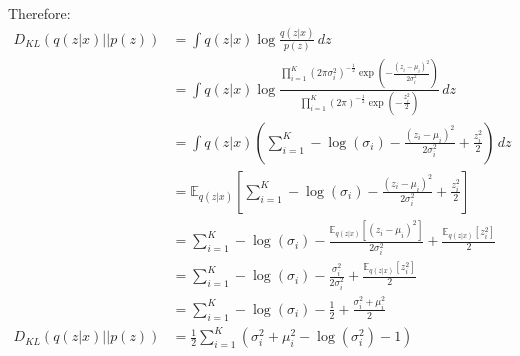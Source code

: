 \documentclass{article}
\begin{document}
Therefore:
\begin{equation}
  \begin{split}
    D_{KL} \left(q(z|x) \lvert\rvert p(z)\right) & = \int q(z|x) \log \frac{q(z|x)}{p(z)} \,dz                                                                                                                                                                                         \\
                                                 & = \int q(z|x) \log \frac{\prod_{i=1}^{K} \left(2\pi\sigma_i^2\right)^{-\frac{1}{2}} \exp\left(-\frac{(z_i - \mu_i)^2}{2\sigma_i^2}\right)}{\prod_{i=1}^{K} \left(2\pi\right)^{-\frac{1}{2}} \exp\left(-\frac{z_i^2}{2}\right)} \,dz \\
                                                 & = \int q(z|x)  \left(\sum_{i=1}^{K} -\log (\sigma_i) - \frac{(z_i - \mu_i)^2}{2\sigma_i^2} + \frac{z_i^2}{2}\right) \,dz                                                                                                            \\
                                                 & = \mathbb{E}_{q(z|x)}\left[\sum_{i=1}^{K} -\log (\sigma_i) - \frac{(z_i - \mu_i)^2}{2\sigma_i^2} + \frac{z_i^2}{2}\right]                                                                                                           \\
                                                 & = \sum_{i=1}^{K} -\log(\sigma_i) - \frac{\mathbb{E}_{q(z|x)}\left[(z_i - \mu_i)^2\right]}{2\sigma_i^2} + \frac{\mathbb{E}_{q(z|x)}\left[z_i^2\right]}{2}                                                                            \\
                                                 & = \sum_{i=1}^{K} -\log(\sigma_i) - \frac{\sigma_i^2}{2\sigma_i^2} + \frac{\mathbb{E}_{q(z|x)}[z_i^2]}{2}                                                                                                                            \\
                                                 & = \sum_{i=1}^{K} -\log(\sigma_i) - \frac{1}{2} + \frac{\sigma_i^2 + \mu_i^2}{2}                                                                                                                                                     \\
    D_{KL} \left(q(z|x) \lvert\rvert p(z)\right) & = \frac{1}{2} \sum_{i=1}^{K} \left(\sigma_i^2 + \mu_i^2 - \log(\sigma_i^2) - 1\right)
  \end{split}
\end{equation}
\end{document}

